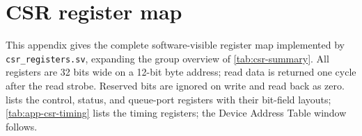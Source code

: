 
\chapter{CSR register map}
\label{app:csr}

This appendix gives the complete software-visible register map implemented by
\texttt{csr\_registers.sv}, expanding the group overview of \cref{tab:csr-summary}. All
registers are 32 bits wide on a 12-bit byte address; read data is returned one cycle after
the read strobe. Reserved bits are ignored on write and read back as zero.
 lists the control, status, and queue-port registers with their
bit-field layouts; \cref{tab:app-csr-timing} lists the timing registers; the Device Address
Table window follows.

